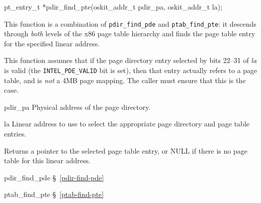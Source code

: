 \label{pdir-find-pte}
\begin{apisyn}

	\funcproto pt_entry_t *pdir_find_pte(oskit_addr_t pdir_pa,
					     oskit_addr_t la);
\end{apisyn}
\begin{apidesc}
	This function is a combination of {\tt pdir_find_pde}
	and {\tt ptab_find_pte}:
	it descends through \emph{both} levels of the x86 page table hierarchy
	and finds the page table entry for the specified linear address.

	This function assumes that
	if the page directory entry selected by bits 22--31 of \emph{la}
	is valid (the {\tt INTEL_PDE_VALID} bit is set),
	then that entry actually refers to a page table,
	and is \emph{not} a 4MB page mapping.
	The caller must ensure that this is the case.
\end{apidesc}
\begin{apiparm}
	\item[pdir_pa]
		Physical address of the page directory.
	\item[la]
		Linear address to use to select the appropriate
		page directory and page table entries.
\end{apiparm}
\begin{apiret}
	Returns a pointer to the selected page table entry,
	or NULL if there is no page table for this linear address.
\end{apiret}
\begin{apidep}
	\item[pdir_find_pde]	\S~\ref{pdir-find-pde}
	\item[ptab_find_pte]	\S~\ref{ptab-find-pte}
\end{apidep}

